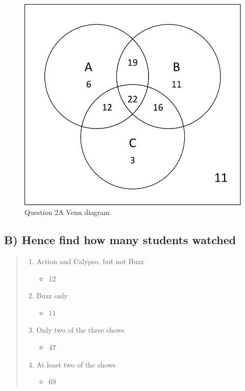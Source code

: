 \documentclass[12pt,a4paper]{article}
\begin{document}
\begin{figure}[h]
\centering
\caption{Question 2A Venn diagram}
\includegraphics[scale=0.5]{./../img/venn_movies.pdf}
\end{figure}

\subsection{B) Hence find how many students watched}
\begin{quote}
\begin{enumerate}
\item Action and Calypso, but not Buzz
	\begin{itemize}
	\item 12
	\end{itemize}
\item Buzz only
	\begin{itemize}
	\item 11
	\end{itemize}
\item Only two of the three shows
	\begin{itemize}
	\item 47
	\end{itemize}
\item At least two of the shows
	\begin{itemize}
	\item 69
	\end{itemize}
\end{enumerate}
\end{quote}
\end{document}
